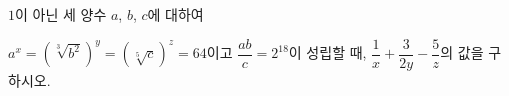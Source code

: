 $1$이 아닌 세 양수 $a$, $b$, $c$에 대하여\par\noindent $a^x=(\sqrt[3]{b^2})^y=(\sqrt[5]{c})^z=64$이고 $\dfrac{ab}{c}=2^{18}$이 성립할 때, $\dfrac{1}{x}+\dfrac{3}{2y}-\dfrac{5}{z}$의 값을 구하시오.
